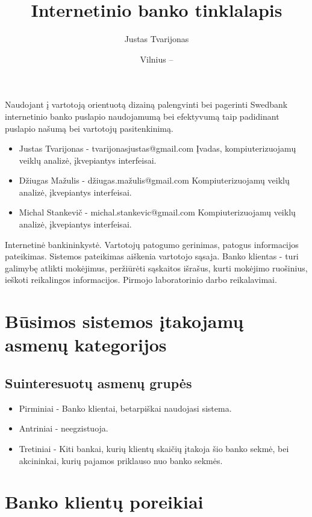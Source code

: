 \documentclass{VUMIFPSkursinis}
\title{Internetinio banko tinklalapis}
\author{Justas Tvarijonas}
\date{Vilnius – \the\year}
\begin{document}
\maketitle
{}
Naudojant į vartotoją orientuotą dizainą palengvinti bei pagerinti Swedbank internetinio banko puslapio naudojamumą bei efektyvumą taip padidinant puslapio našumą bei vartotojų pasitenkinimą.
\begin{itemize}
	\item Justas Tvarijonas - tvarijonasjustas@gmail.com \newline
	Įvadas, kompiuterizuojamų veiklų analizė, įkvepiantys interfeisai.
	\item Džiugas Mažulis - džiugas.mažulis@gmail.com \newline 
	Kompiuterizuojamų veiklų analizė, įkvepiantys interfeisai.
	\item Michal Stankevič - michal.stankevic@gmail.com \newline
	 Kompiuterizuojamų veiklų analizė, įkvepiantys interfeisai.
\end{itemize}
\tableofcontents
{}
Internetinė bankininkystė.
Vartotojų patogumo gerinimas, patogus informacijos pateikimas. Sistemos pateikimas aiškenia vartotojo sąsaja.
Banko klientas - turi galimybę atlikti mokėjimus, peržiūrėti sąskaitos išrašus, kurti mokėjimo ruošinius, ieškoti reikalingos informacijos.
Pirmojo laboratorinio darbo reikalavimai.
\section{Būsimos sistemos įtakojamų asmenų kategorijos}
\subsection{Suinteresuotų asmenų grupės}
\begin{itemize}
	\item Pirminiai - Banko klientai, betarpiškai naudojasi sistema.
	\item Antriniai - neegzistuoja.
	\item Tretiniai - Kiti bankai, kurių klientų skaičių įtakoja šio banko sekmė, bei akcininkai, kurių pajamos priklauso nuo banko sekmės.
\end{itemize}
\section{Banko klientų poreikiai}
\end{document}
